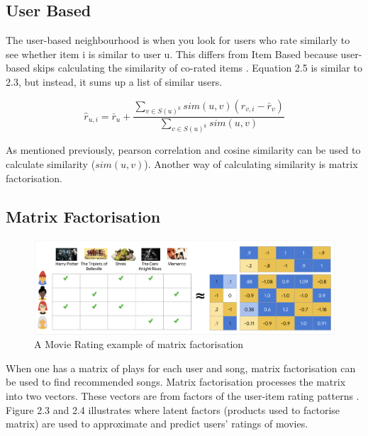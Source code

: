 \subsection{User Based}

The user-based neighbourhood is when you look for users who rate similarly to see whether item i is similar to user u. This differs from Item Based because user-based skips calculating the similarity of co-rated items \citep{pinela_recommender_2017}. Equation 2.5 is similar to 2.3, but instead, it sums up a list of similar users.

\begin{equation}
	\hat{r} _{u,i} = \bar{r}_{u} + \frac{ \sum _{v \in S(u)^{k}} sim(u ,v) ( r_{v, i} - \bar{r}_{v})}{\sum _{v \in S(u)^{k}} sim(u , v)}
\end{equation}

As mentioned previously, pearson correlation and cosine similarity can be used to calculate similarity ($sim(u ,v)$). Another way of calculating similarity is matrix factorisation.

\subsection{Matrix Factorisation}

\begin{figure}[H]
	\includegraphics[scale=0.45]{images/matrix_factorisation_example}
	\centering
	\caption{A Movie Rating example of matrix factorisation  \citep{httpsdevelopersgooglecom_matrix_2023}} 
	\label{fig:figure}
\end{figure}

When one has a matrix of plays for each user and song, matrix factorisation can be used to find recommended songs. Matrix factorisation processes the matrix into two vectors. These vectors are from factors of the user-item rating patterns \citep{koren_matrix_2009}. Figure 2.3 and 2.4 illustrates where latent factors (products used to factorise matrix) are used to approximate and predict users' ratings of movies. 


